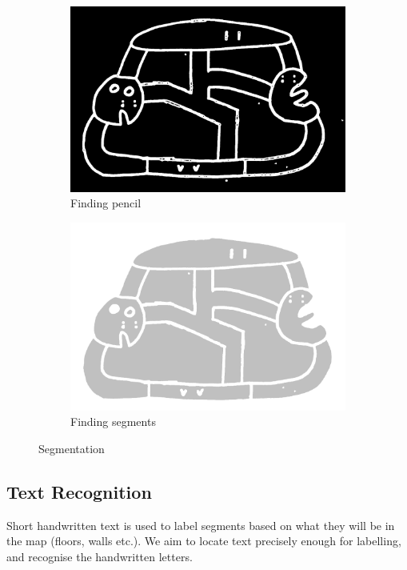 \documentclass[conference]{IEEEtran}
\begin{document}
\begin{figure}[h]
     \centering
     \begin{subfigure}[b]{0.24\textwidth}
         \centering
         \includegraphics[width=\textwidth]{s1}
         \caption{Finding pencil}
         \label{fig:s1}
     \end{subfigure}
     \hfill
     \begin{subfigure}[b]{0.24\textwidth}
         \centering
         \includegraphics[width=\textwidth]{s2}
         \caption{Finding segments}
         \label{fig:s2}
     \end{subfigure}
        \caption{Segmentation}
        \label{fig:seg}
\end{figure}

\subsection{Text Recognition}
Short handwritten text is used to label segments based on what they will be in the map (floors, walls etc.). We aim to locate text precisely enough for labelling, and recognise the handwritten letters. 
\end{document}
